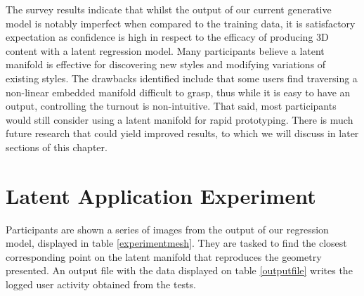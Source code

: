 \documentclass[ %
author={Dillon Keith Diep},
supervisor={Dr. Carl Henrik Ek},
degree={MEng},
title={ART-CG:},
subtitle={Assisted Real-time Content Generation of 3D Hair by Learning Manifolds},
type={Research},
year={2017} ]{dissertation}
\begin{document}
The survey results indicate that whilst the output of our current generative model is notably imperfect when compared to the training data, it is satisfactory expectation as confidence is high in respect to the efficacy of producing 3D content with a latent regression model. Many participants believe a latent manifold is effective for discovering new styles and modifying variations of existing styles. The drawbacks identified include that some users find traversing a non-linear embedded manifold difficult to grasp, thus while it is easy to have an output, controlling the turnout is non-intuitive. That said, most participants would still consider using a latent manifold for rapid prototyping. There is much future research that could yield improved results, to which we will discuss in later sections of this chapter.

\section{Latent Application Experiment}
Participants are shown a series of images from the output of our regression model, displayed in table \ref{experimentmesh}. They are tasked to find the closest corresponding point on the latent manifold that reproduces the geometry presented. An output file with the data displayed on table \ref{outputfile} writes the logged user activity obtained from the tests.
\end{document}
